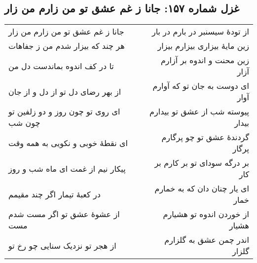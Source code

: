 \begin{center}
\section*{غزل شماره ۱۵۷: جانا ز غم عشق تو من زارم من زار}
\label{sec:157}
\begin{longtable}{l p{0.5cm} r}
جانا ز غم عشق تو من زارم من زار
&&
از تودهٔ سیسنبر در بارم در بار
\\
هر چند که بیزار شدم من ز جفاهات
&&
زین مایهٔ بیزاری بیزارم بیزار
\\
تا در کف اندوه بماندست دل من
&&
زین محنت و اندوه بر آزارم آزار
\\
از بهر رضای دل تو از دل و از جان
&&
ای دوست به جان تو که آوارم آوار
\\
ای روی تو چون روز و دو زلفین تو چون شب
&&
پیوسته شب از عشق تو بیدارم بیدار
\\
ای نقطهٔ خوبی و نکویی به همه وقت
&&
گردندهٔ عشق تو چو پرگارم پرگار
\\
پیکار نیم از غمت ای ماه شب و روز
&&
بر درگه سودای تو بر کارم بر کار
\\
در کعبهٔ تیمار اگر چند مقیمم
&&
ای یار چنان دان که به خمارم خمار
\\
از عشوهٔ عشق تو اگر مست شدم مست
&&
از خوردن اندوه تو هشیارم هشیار
\\
از هجر تو نزدیک سنایی چو رخ تو
&&
اندر چمن عشق به گلزارم گلزار
\\
\end{longtable}
\end{center}
